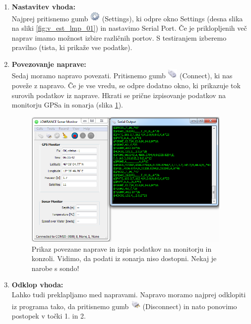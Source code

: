 \documentclass[11pt]{article}
\begin{document}
\begin{enumerate}
	\item \textbf{Nastavitev vhoda:}\\[1mm]
	Najprej pritisnemo gumb  \includegraphics[width=5mm]{figs/icons/settings.png} (Settings), ki odpre okno Settings (desna slika na sliki \ref{fig:v_est_lmp_01}) in nastavimo Serial Port. Če je priklopljenih več naprav imamo možnost izbire različnih portov. S testiranjem izberemo pravilno (tista, ki prikaže vse podatke).\\[2mm]
	
	\item \textbf{Povezovanje naprave:}\\[1mm]
	Sedaj moramo napravo povezati. Pritisnemo gumb \includegraphics[width=5mm]{figs/icons/connect.png} (Connect), ki nas poveže z napravo. Če je vse vredu, se odpre dodatno okno, ki prikazuje tok surovih podatkov iz naprave. Hkrati se prične izpisovanje podatkov na monitorju GPSa in sonarja (slika \ref{fig:v_est_lmp_02}).\\[2mm]
	
	\begin{figure}[!h]
		\centering \includegraphics[width=10cm]{figs/connected.png}
		\caption{Prikaz povezane naprave in izpis podatkov na monitorju in konzoli.  Vidimo, da podati iz sonarja niso dostopni. Nekaj je narobe s sondo!}
		\label{fig:v_est_lmp_02}
	\end{figure}
	
	\item \textbf{Odklop vhoda:}\\[1mm]
	Lahko tudi preklapljamo med napravami. Napravo moramo najprej odklopiti iz  programa tako, da pritisnemo gumb \includegraphics[width=5mm]{figs/icons/disconnect.png} (Disconnect) in nato ponovimo postopek v točki 1. in 2.\\[2mm]
	

\end{enumerate}
\end{document}
